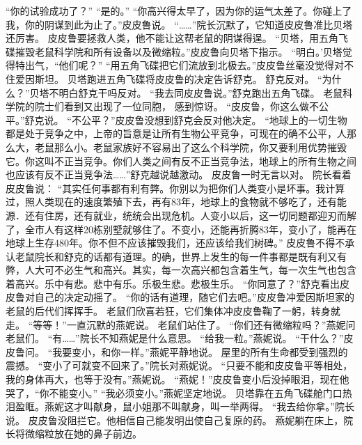\documentclass[a4paper,12pt,UTF8,twoside]{ctexbook}
\begin{document}
        “你的试验成功了？”  
        “是的。”  
        “你高兴得太早了，因为你的运气太差了。你碰上了我，你的阴谋到此为止了。”皮皮鲁说。  
       “……”院长沉默了，它知道皮皮鲁准比贝塔还厉害。  
        皮皮鲁要拯救人类，他不能让这帮老鼠的阴谋得逞。  
        “贝塔，用五角飞碟摧毁老鼠科学院和所有设备以及微缩粒。”皮皮鲁向贝塔下指示。  
        “明白。’贝塔觉得特出气，“他们呢？”  
        “用五角飞碟把它们流放到北极去。”皮皮鲁丝毫没觉得对不住爱因斯坦。  
        贝塔跑进五角飞碟将皮皮鲁的决定告诉舒克。  
        舒克反对。  
        “为什么？”贝塔不明白舒克干吗反对。  
        “我去同皮皮鲁说。”舒克跑出五角飞碟。  
        老鼠科学院的院士们看到又出现了一位同胞， 感到惊讶。  
        “皮皮鲁，你这么做不公平。”舒克说。  
        “不公平？”皮皮鲁没想到舒克会反对他决定。  
        “地球上的一切生物都是处于竞争之中，上帝的旨意是让所有生物公平竞争，可现在的确不公平，人那么大，老鼠那么小。老鼠家族好不容易出了这么个科学院，你又要利用优势摧毁它。你这叫不正当竞争。你们人类之间有反不正当竞争法，地球上的所有生物之间也应该有反不正当竞争法……”舒克越说越激动。  
        皮皮鲁一时无言以对。  
        院长看着皮皮鲁说：  
        “其实任何事都有利有弊。你别以为把你们人类变小是坏事。我计算过，照人类现在的速度繁殖下去，再有83年，地球上的食物就不够吃了，还有能源．还有住房，还有就业，统统会出现危机。人变小以后，这一切同题都迎刃而解了，全市人有这样20栋别墅就够住了。不变小，还能再折腾83年，变小了，能再在地球上生存480年。你不但不应该摧毁我们，还应该给我们树碑。”  
        皮皮鲁不得不承认老鼠院长和舒克的话都有道理。的确，世界上发生的每一件事都是既有利又有弊，人大可不必生气和高兴。其实，每一次高兴都包含着生气，每一次生气也包含着高兴。乐中有悲。悲中有乐。乐极生悲。悲极生乐。  
        “你同意了？”舒克看出皮皮鲁对自己的决定动摇了。  
        “你的话有道理，随它们去吧。”皮皮鲁冲爱因斯坦家的老鼠的后代们挥挥手。  
        老鼠们欣喜若狂，它们集体冲皮皮鲁鞠了一躬，转身就走。  
        “等等！”一直沉默的燕妮说。  
        老鼠们站住了。  
        “你们还有微缩粒吗？”燕妮问老鼠们。  
        “有……”院长不知燕妮是什么意思。  
        “给我一粒。”燕妮说。  
        “干什么？”皮皮鲁问。  
        “我要变小，和你一样。”燕妮平静地说。  
        屋里的所有生命都受到强烈的震撼。  
        “变小了可就变不回来了。”院长对燕妮说。  
        “只要不能和皮皮鲁平等相处，我的身体再大，也等于没有。”燕妮说。  
        “燕妮！”皮皮鲁变小后没掉眼泪，现在他哭了，“你不能变小。”  
        “我必须变小。”燕妮坚定地说。  
        贝塔靠在五角飞碟舱门口热泪盈眶。燕妮这才叫献身，鼠小姐那不叫献身，叫一举两得。  
        “我去给你拿。”院长说。        
        皮皮鲁没阻拦它。他相信自己能发明出使自己复原的药。  
        燕妮躺在床上，院长将微缩粒放在她的鼻子前边。  
\end{document}
